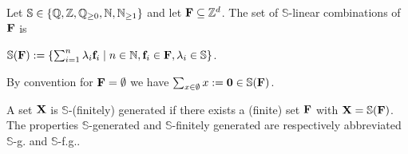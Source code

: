 
Let \(\mathbb{S} \in \{\mathbb{Q}, \mathbb{Z}, \mathbb{Q}_{\geq 0}, \mathbb{N}, \mathbb{N}_{\geq 1}\}\) and let \(\mathbf{F} \subseteq \mathbb{Z}^d\). The set of \(\mathbb{S}\)-linear combinations of \(\mathbf{F}\) is 

\(\mathbb{S}(\mathbf{F}):=\{ \sum_{i=1}^n \lambda_i \mathbf{f}_i \mid n \in \mathbb{N}, \mathbf{f}_i \in \mathbf{F}, \lambda_i \in \mathbb{S}\}\).

By convention for \(\mathbf{F}=\emptyset\) we have \(\sum_{x \in \emptyset} x:=\mathbf{0} \in \mathbb{S}(\mathbf{F})\). 

A set \(\mathbf{X}\) is \(\mathbb{S}\)-(finitely) generated  if there exists a (finite) set \(\mathbf{F}\) with \(\mathbf{X}=\mathbb{S}(\mathbf{F})\). The properties \(\mathbb{S}\)-generated and \(\mathbb{S}\)-finitely generated are respectively abbreviated \(\mathbb{S}\)-g. and \(\mathbb{S}\)-f.g.. 


%



